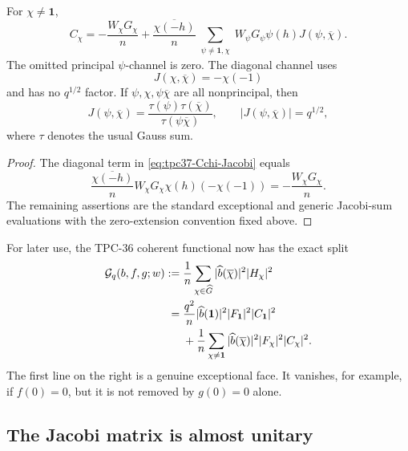 \begin{corollary}
\label{cor:tpc37-exceptional-Jacobi-channels}
For \(\chi\ne\mathbf1\),
\begin{equation}
 \boxed{
 C_\chi=-\frac{W_\chi G_\chi}{n}
 +\frac{\overline{\chi(-h)}}n
 \sum_{\substack{\psi\ne\mathbf1,\chi}}
 W_\psi G_\psi\psi(h)J(\psi,\overline\chi).}
 \label{eq:tpc37-Cchi-exception-split}
\end{equation}
The omitted principal \(\psi\)-channel is zero.  The diagonal channel
uses
\begin{equation}
 J(\chi,\overline\chi)=-\chi(-1)
 \label{eq:tpc37-diagonal-Jacobi}
\end{equation}
and has no \(q^{1/2}\) factor.  If
\(\psi,\chi,\psi\overline\chi\) are all nonprincipal, then
\begin{equation}
 J(\psi,\overline\chi)
 =\frac{\tau(\psi)\tau(\overline\chi)}
 {\tau(\psi\overline\chi)},
 \qquad
 |J(\psi,\overline\chi)|=q^{1/2},
 \label{eq:tpc37-generic-Jacobi}
\end{equation}
where \(\tau\) denotes the usual Gauss sum.
\end{corollary}

\begin{proof}
The diagonal term in \eqref{eq:tpc37-Cchi-Jacobi} equals
\[
 \frac{\overline{\chi(-h)}}n
 W_\chi G_\chi\chi(h)(-\chi(-1))
 =-\frac{W_\chi G_\chi}{n}.
\]
The remaining assertions are the standard exceptional and generic
Jacobi-sum evaluations with the zero-extension convention fixed above.
\end{proof}

For later use, the TPC-36 coherent functional now has the exact split
\begin{align}
 \mathcal G_q(b,f,g;w)
 :={}&\frac1n\sum_{\chi\in\widehat G}
 |\widehat b(\overline\chi)|^2|H_\chi|^2
 \notag\\
 ={}&\frac{q^2}{n}|\widehat b(\mathbf1)|^2
 |F_{\mathbf1}|^2|C_{\mathbf1}|^2
 \notag\\
 &+\frac1n\sum_{\chi\ne\mathbf1}
 |\widehat b(\overline\chi)|^2|F_\chi|^2|C_\chi|^2.
 \label{eq:tpc37-coherent-functional-split}
\end{align}
The first line on the right is a genuine exceptional face.  It vanishes,
for example, if \(f(0)=0\), but it is not removed by
\(g(0)=0\) alone.

\subsection{The Jacobi matrix is almost unitary}

